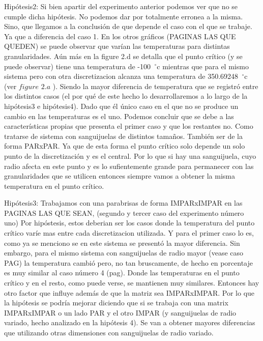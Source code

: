 \documentclass[a4paper]{article}
\begin{document}
Hipótesis2: Si bien apartir del experimento anterior podemos ver que no se cumple dicha hipótesis. No podemos dar por totalmente erronea a la misma. Sino, que llegamos a la conclusión de que depende el caso con el que se trabaje. Ya que a diferencia del caso 1. En los otros gráficos (PAGINAS LAS QUE QUEDEN) se puede observar que varían las temperaturas para distintas granularidades. Aún más en la figure 2.d se detalla que el punto crítico (y se puede observar) tiene una temperatura de -100\hspace{-1.5mm}$\phantom{a}^{\circ}$c mientras que para el mismo sistema pero con otra discretizacion alcanza una temperatura de  350.69248\hspace{-1.5mm}$\phantom{a}^{\circ}$c (ver $figure$ $2.a$ ). Siendo la mayor diferencia de temperatura que se registró entre los distintos casos (el por qué de este hecho lo desarrollaremos a lo largo de la hipótesis3 e hipótesis4). Dado que él único caso en el que no se produce un cambio en las temperaturas es el uno. Podemos concluir que se debe a las características propias que presenta el primer caso y que los restantes no. Como tratarse de sistema con sanguijuelas de distintos tamaños. También ser de la forma PARxPAR. Ya que de esta forma el punto crítico solo depende un solo punto de la discretización y es el central. Por lo que si hay una sanguijuela, cuyo radio afecta en este punto y es lo sufientemente grande para permanecer con las granularidades que se utilicen entonces siempre vamos a obtener la misma temperatura en el punto crítico. \newline \newline


Hipótesis3: Trabajamos con una parabrisas de forma IMPARxIMPAR en las PAGINAS LAS QUE SEAN, (segundo y tercer caso del experimento número uno) Por hipóstesis, estos deberian ser los casos donde la temperatura del punto crítico varíe mas entre cada discretizacion utilizada. Y para el primer caso lo es, como ya se menciono se en este sistema se presentó la mayor diferencia. Sin embargo, para el mismo sistema con sanguijuelas de radio mayor (vease caso PAG) la temperatura cambió pero, no tan bruscamente, de hecho en porcentaje es muy similar al caso número 4 (pag). Donde las temperaturas en el punto crítico y en el resto, como puede verse, se mantienen muy similares. Entonces hay otro factor que influye además de que la matriz sea IMPARxIMPAR. Por lo que la hipótesis se podría mejorar diciendo que si se trabaja con una matrix IMPARxIMPAR o un lado PAR y el otro IMPAR (y sanguijuelas de radio variado, hecho analizado en la hipótesis 4). Se van a obtener mayores diferencias que utilizando otras dimensiones con sanguijuelas de radio variado.\newline \newline
\end{document}
